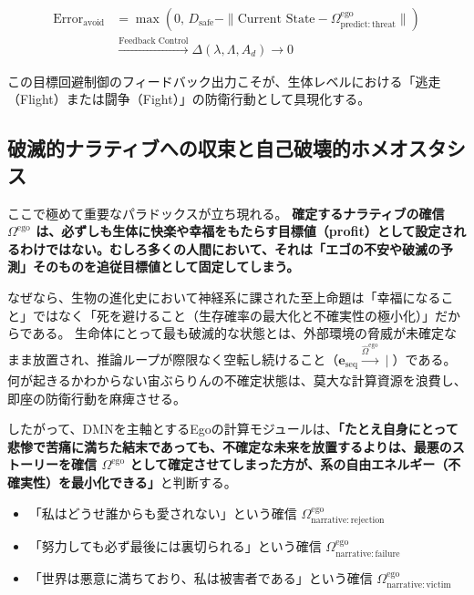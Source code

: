 \begin{align}
    \text{Error}_{\mathrm{avoid}} &= \max\left( 0,\, D_{\mathrm{safe}} - \| \text{Current State} - \Omega^{\mathrm{ego}}_{\mathrm{predict:threat}} \| \right) \\
                                  &\xrightarrow{\text{Feedback Control}} \Delta (\lambda, \Lambda, A_d) \longrightarrow 0
\end{align}

この目標回避制御のフィードバック出力こそが、生体レベルにおける「逃走（Flight）または闘争（Fight）」の防衛行動として具現化する。

\subsection{破滅的ナラティブへの収束と自己破壊的ホメオスタシス}

ここで極めて重要なパラドックスが立ち現れる。
\textbf{確定するナラティブの確信 $\Omega^{\mathrm{ego}}$ は、必ずしも生体に快楽や幸福をもたらす目標値（profit）として設定されるわけではない。むしろ多くの人間において、それは「エゴの不安や破滅の予測」そのものを追従目標値として固定してしまう。}

なぜなら、生物の進化史において神経系に課された至上命題は「幸福になること」ではなく「死を避けること（生存確率の最大化と不確実性の極小化）」だからである。
生命体にとって最も破滅的な状態とは、外部環境の脅威が未確定なまま放置され、推論ループが際限なく空転し続けること（$\boldsymbol{e}_{\mathrm{seq}} \xrightarrow[]{\hat{\Omega}^{\mathrm{ego}}} \mid$）である。何が起きるかわからない宙ぶらりんの不確定状態は、莫大な計算資源を浪費し、即座の防衛行動を麻痺させる。

したがって、DMNを主軸とするEgoの計算モジュールは、\textbf{「たとえ自身にとって悲惨で苦痛に満ちた結末であっても、不確定な未来を放置するよりは、最悪のストーリーを確信 $\Omega^{\mathrm{ego}}$ として確定させてしまった方が、系の自由エネルギー（不確実性）を最小化できる」}と判断する。

\begin{itemize}
    \item 「私はどうせ誰からも愛されない」という確信 $\Omega^{\mathrm{ego}}_{\mathrm{narrative:rejection}}$
    \item 「努力しても必ず最後には裏切られる」という確信 $\Omega^{\mathrm{ego}}_{\mathrm{narrative:failure}}$
    \item 「世界は悪意に満ちており、私は被害者である」という確信 $\Omega^{\mathrm{ego}}_{\mathrm{narrative:victim}}$
\end{itemize}

